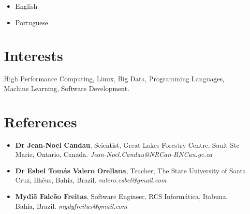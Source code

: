 \documentclass[a4paper, oneside, final]{scrartcl} %
\begin{document}
\begin{center}
\begin{itemize} \itemsep1pt \parskip0pt 
  \item English
  \item Portuguese 
\end{itemize}


\section{Interests}

\begin{flushleft}
High Performance Computing, Linux, Big Data, Programming Languages, Machine Learning, Software Development.
\end{flushleft}


\section{References}

\begin{itemize} \itemsep4pt \parskip0pt 
\item \textbf{Dr Jean-Noel Candau}, Scientist, Great Lakes Forestry Centre, Sault Ste Marie, Ontario, Canada. \textit{Jean-Noel.Candau@NRCan-RNCan.gc.ca}

\item \textbf{Dr Esbel Tomás Valero Orellana}, Teacher, The State University of Santa Cruz, Ilhéus, Bahia, Brazil. \textit{valero.esbel@gmail.com} 

\item \textbf{Mydiã Falcão Freitas}, Software Engineer, RCS Informática, Itabuna, Bahia, Brazil. \textit{mydyfreitas@gmail.com} 
\end{itemize}

\end{center}
\end{document}
